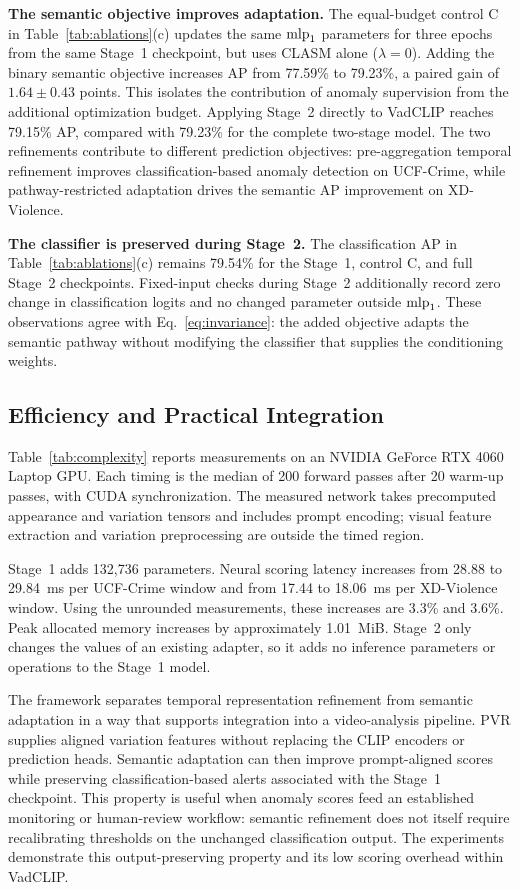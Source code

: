 \textbf{The semantic objective improves adaptation.}
The equal-budget control C in Table~\ref{tab:ablations}(c) updates the same $\mathrm{mlp}_1$ parameters for three epochs from the same Stage~1 checkpoint, but uses CLASM alone ($\lambda=0$). Adding the binary semantic objective increases AP from 77.59\% to 79.23\%, a paired gain of $1.64\pm0.43$ points. This isolates the contribution of anomaly supervision from the additional optimization budget. Applying Stage~2 directly to VadCLIP reaches 79.15\% AP, compared with 79.23\% for the complete two-stage model. The two refinements contribute to different prediction objectives: pre-aggregation temporal refinement improves classification-based anomaly detection on UCF-Crime, while pathway-restricted adaptation drives the semantic AP improvement on XD-Violence.

\textbf{The classifier is preserved during Stage~2.}
The classification AP in Table~\ref{tab:ablations}(c) remains 79.54\% for the Stage~1, control C, and full Stage~2 checkpoints. Fixed-input checks during Stage~2 additionally record zero change in classification logits and no changed parameter outside $\mathrm{mlp}_1$. These observations agree with Eq.~\eqref{eq:invariance}: the added objective adapts the semantic pathway without modifying the classifier that supplies the conditioning weights.



\subsection{Efficiency and Practical Integration}
Table~\ref{tab:complexity} reports measurements on an NVIDIA GeForce RTX 4060 Laptop GPU. Each timing is the median of 200 forward passes after 20 warm-up passes, with CUDA synchronization. The measured network takes precomputed appearance and variation tensors and includes prompt encoding; visual feature extraction and variation preprocessing are outside the timed region.

Stage~1 adds 132,736 parameters. Neural scoring latency increases from 28.88 to 29.84~ms per UCF-Crime window and from 17.44 to 18.06~ms per XD-Violence window. Using the unrounded measurements, these increases are 3.3\% and 3.6\%. Peak allocated memory increases by approximately 1.01~MiB. Stage~2 only changes the values of an existing adapter, so it adds no inference parameters or operations to the Stage~1 model.

The framework separates temporal representation refinement from semantic adaptation in a way that supports integration into a video-analysis pipeline. PVR supplies aligned variation features without replacing the CLIP encoders or prediction heads. Semantic adaptation can then improve prompt-aligned scores while preserving classification-based alerts associated with the Stage~1 checkpoint. This property is useful when anomaly scores feed an established monitoring or human-review workflow: semantic refinement does not itself require recalibrating thresholds on the unchanged classification output. The experiments demonstrate this output-preserving property and its low scoring overhead within VadCLIP.
